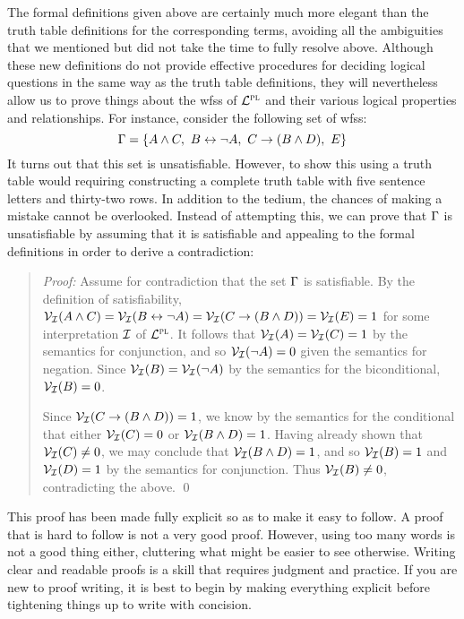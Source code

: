 The formal definitions given above are certainly much more elegant than the truth table definitions for the corresponding terms, avoiding all the ambiguities that we mentioned but did not take the time to fully resolve above.
Although these new definitions do not provide effective procedures for deciding logical questions in the same way as the truth table definitions, they will nevertheless allow us to prove things about the wfss of $\mathcal{L}^{\textsc{pl}}$ and their various logical properties and relationships.
For instance, consider the following set of wfss:
$$ \Gamma = \lbrace A \wedge  C,\ B \leftrightarrow \neg A,\ C \rightarrow (B \wedge D),\ E\rbrace $$
It turns out that this set is unsatisfiable.
However, to show this using a truth table would requiring constructing a complete truth table with five sentence letters and thirty-two rows.
In addition to the tedium, the chances of making a mistake cannot be overlooked.
Instead of attempting this, we can prove that $\Gamma$ is unsatisfiable by assuming that it is satisfiable and appealing to the formal definitions in order to derive a contradiction: 

\begin{quote} 
  \textit{Proof:} Assume for contradiction that the set $\Gamma$ is satisfiable.
  By the definition of satisfiability, $\mathcal{V}_{\mathcal{I}}(A \wedge  C) = \mathcal{V}_{\mathcal{I}}(B \leftrightarrow \neg A) = \mathcal{V}_{\mathcal{I}}(C \rightarrow (B \wedge D)) = \mathcal{V}_{\mathcal{I}}(E) = 1$ for some interpretation $\mathcal{I}$ of $\mathcal{L}^{\textsc{pl}}$. 
  It follows that $\mathcal{V}_{\mathcal{I}}(A) = \mathcal{V}_{\mathcal{I}}(C) = 1$ by the semantics for conjunction, and so $\mathcal{V}_{\mathcal{I}}(\neg A) = 0$ given the semantics for negation. 
  Since $\mathcal{V}_{\mathcal{I}}(B) = \mathcal{V}_{\mathcal{I}}(\neg A)$ by the semantics for the biconditional, $\mathcal{V}_{\mathcal{I}}(B) = 0$. 

  Since $\mathcal{V}_{\mathcal{I}}(C \rightarrow (B \wedge D)) = 1$, we know by the semantics for the conditional that either $\mathcal{V}_{\mathcal{I}}(C) = 0$ or $\mathcal{V}_{\mathcal{I}}(B \wedge D) = 1$.
  Having already shown that $\mathcal{V}_{\mathcal{I}}(C) \neq 0$, we may conclude that $\mathcal{V}_{\mathcal{I}}(B \wedge D) = 1$, and so $\mathcal{V}_{\mathcal{I}}(B) = 1$ and $\mathcal{V}_{\mathcal{I}}(D) = 1$ by the semantics for conjunction.
  Thus $\mathcal{V}_{\mathcal{I}}(B) \neq 0$, contradicting the above.
  \qed
\end{quote}

This proof has been made fully explicit so as to make it easy to follow.
A proof that is hard to follow is not a very good proof.
However, using too many words is not a good thing either, cluttering what might be easier to see otherwise.
Writing clear and readable proofs is a skill that requires judgment and practice.
If you are new to proof writing, it is best to begin by making everything explicit before tightening things up to write with concision.

